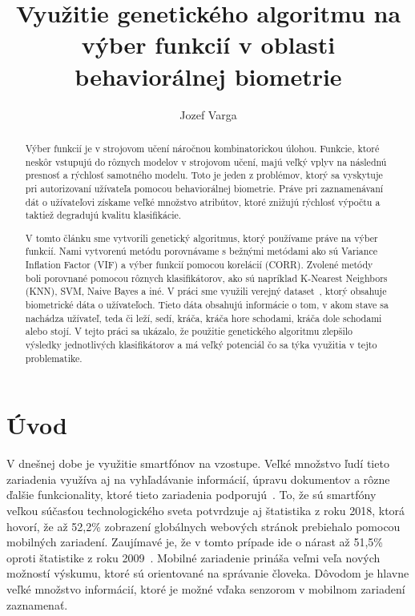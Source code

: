 \documentclass[runningheads]{llncs}
\begin{document}
%
\title{Využitie genetického algoritmu na výber funkcií v oblasti behaviorálnej biometrie}
%
%
\author{Jozef Varga}
%
%
\maketitle              %
%
\begin{abstract}
    Výber funkcií je v strojovom učení náročnou kombinatorickou úlohou. 
    Funkcie, ktoré neskôr vstupujú do rôznych modelov v strojovom učení, majú
    veľký vplyv na následnú presnosť a rýchlosť samotného modelu. Toto je jeden z problémov,
    ktorý sa vyskytuje pri autorizovaní užívateľa pomocou behaviorálnej biometrie. Práve pri
    zaznamenávaní dát o užívateľovi získame veľké množstvo atribútov, ktoré znižujú rýchlosť výpočtu
    a taktiež degradujú kvalitu klasifikácie. 
    
    V tomto článku sme vytvorili genetický algoritmus, ktorý používame práve na výber funkcií. Nami vytvorenú
    metódu porovnávame s bežnými metódami ako sú Variance Inflation Factor (VIF) a výber funkcií pomocou korelácií (CORR). 
    Zvolené metódy boli porovnané pomocou rôznych klasifikátorov, ako sú napríklad K-Nearest Neighbors (KNN), SVM, Naive Bayes a iné. 
    V práci sme využili verejný dataset~\cite{ref_dataset_anguita,ref_dataset}, ktorý obsahuje biometrické dáta o 
    užívateľoch. Tieto dáta obsahujú informácie o tom, v akom stave sa nachádza užívateľ, teda či leží, sedí, 
    kráča,  kráča hore schodami, kráča dole schodami alebo stojí.
    V tejto práci sa ukázalo, že použitie genetického algoritmu zlepšilo výsledky jednotlivých klasifikátorov a 
    má veľký potenciál čo sa týka využitia v tejto problematike.

\end{abstract}
%

\section{Úvod}

V dnešnej dobe je využitie smartfónov na vzostupe. 
Veľké množstvo ľudí tieto zariadenia využíva aj na vyhľadávanie informácií, 
úpravu dokumentov a rôzne ďalšie funkcionality, 
ktoré tieto zariadenia podporujú~\cite{ref_bomhold}. 
To, že sú smartfóny veľkou súčasťou technologického sveta potvrdzuje aj 
štatistika z roku 2018, ktorá hovorí, že až 52,2\% 
zobrazení globálnych webových stránok prebiehalo pomocou mobilných zariadení. 
Zaujímavé je, že v tomto prípade ide o nárast až 51,5\% 
oproti štatistike z roku 2009~\cite{ref_statista19}. Mobilné zariadenie
prináša veľmi veľa nových možností výskumu, ktoré sú orientované na správanie človeka.
Dôvodom je hlavne veľké množstvo informácií, ktoré je možné vďaka senzorom v mobilnom 
zariadení zaznamenať. 
\end{document}
